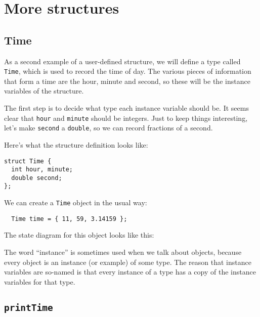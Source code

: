 


\chapter{More structures}
\label{time}

\section{Time}

As a second example of a user-defined structure, we will define a type
called {\tt Time}, which is used to record the time of day.  The
various pieces of information that form a time are the hour, minute
and second, so these will be the instance variables of the structure.

The first step is to decide what type each instance variable should
be.  It seems clear that {\tt hour} and {\tt minute} should be
integers.  Just to keep things interesting, let's make {\tt second} a
{\tt double}, so we can record fractions of a second.

Here's what the structure definition looks like:

\begin{verbatim}
struct Time {
  int hour, minute;
  double second;
};
\end{verbatim}
%
We can create a {\tt Time} object in the usual way:

\begin{verbatim}
  Time time = { 11, 59, 3.14159 };
\end{verbatim}
%
The state diagram for this object looks like this:

\vspace{0.1in}
\centerline{}
\vspace{0.1in}

The word ``instance'' is sometimes used when we talk about objects,
because every object is an instance (or example) of some type.  The
reason that instance variables are so-named is that every instance of
a type has a copy of the instance variables for that type.

\section{{\tt printTime}}
\label{printobject}

